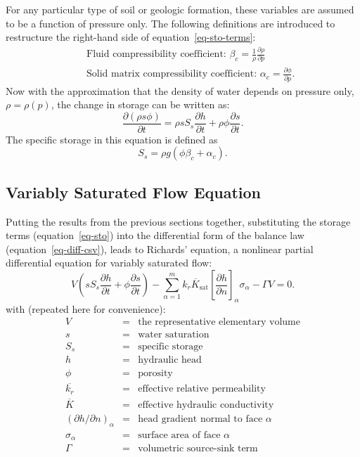 \documentclass[fleqn]{article}
\begin{document}
For any particular type of soil or geologic formation, these variables
are assumed to be a function of pressure only. The following definitions
are introduced to restructure the right-hand side of
equation~\ref{eq-sto-terms}:
\begin{eqnarray*}
  &&\text{Fluid compressibility coefficient: }
    \beta_c = \frac{1}{\rho} \frac{\partial \rho}{\partial p} \\
  &&\text{Solid matrix compressibility coefficient: }
    \alpha_c = \frac{\partial \phi}{\partial p}.
\end{eqnarray*}
Now with the approximation that the density of water depends on
pressure only, $\rho = \rho(p)$, the change in storage can be written
as:
\begin{equation}
  \frac{\partial (\rho s \phi)}{\partial t} =
  \rho s S_s \frac{\partial h}{\partial t} +
  \rho \phi \frac{\partial s}{\partial t}.
  \label{eq-sto}
\end{equation}
The specific storage in this equation is defined as
\begin{equation}
  S_s = \rho g \left( \phi \beta_c + \alpha_c \right).
  \label{eq-spec-sto}
\end{equation}

\subsection{Variably Saturated Flow Equation}
Putting the results from the previous sections together,
substituting the storage terms (equation~\ref{eq-sto}) into the 
differential form of the balance law (equation~\ref{eq-diff-csv}), 
leads to Richards' equation, a nonlinear partial differential equation for 
variably saturated flow:
\begin{equation}  
  V
  \left(
    s S_s \frac{\partial h}{\partial t} + 
    \phi \frac{\partial s}{\partial t}
  \right) -
  \sum_{\alpha=1}^{m} \overline{k_r K_{\textrm{sat}}}
  \left[\frac{\partial h}{\partial n}\right]_\alpha \sigma_\alpha -
  \Gamma V = 0.
  \label{eq-unsat-flow}
\end{equation}
with (repeated here for convenience):
\begin{eqnarray*}
  V &=& \text{the representative elementary volume} \\
  s &=& \text{water saturation} \\
  S_s &=& \text{specific storage} \\
  h &=& \text{hydraulic head} \\
  \phi &=& \text{porosity} \\
  \overline{k_r} &=& \text{effective relative permeability} \\
  \overline{K} &=& \text{effective hydraulic conductivity} \\
  (\partial h/\partial n)_\alpha &=& \text{head gradient normal to face $\alpha$} \\
  \sigma_\alpha &=& \text{surface area of face $\alpha$} \\
  \Gamma &=& \text{volumetric source-sink term}
\end{eqnarray*}
\end{document}
